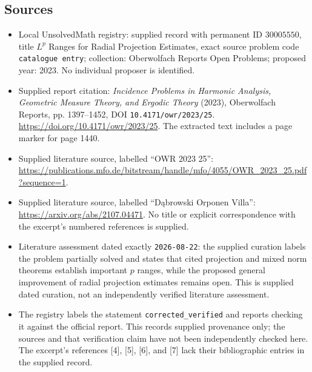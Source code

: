\documentclass[11pt]{article}
\begin{document}
\subsection{Sources}
\begin{itemize}
\item Local UnsolvedMath registry: supplied record with permanent ID \(30005550\), title \(L^p\) Ranges for Radial Projection Estimates, exact source problem code \texttt{catalogue entry}; collection: Oberwolfach Reports Open Problems; proposed year: 2023. No individual proposer is identified.
\item Supplied report citation: \emph{Incidence Problems in Harmonic Analysis, Geometric Measure Theory, and Ergodic Theory} (2023), Oberwolfach Reports, pp. 1397--1452, DOI \texttt{10.4171/owr/2023/25}. \url{https://doi.org/10.4171/owr/2023/25}. The extracted text includes a page marker for page 1440.
\item Supplied literature source, labelled ``OWR 2023 25'': \url{https://publications.mfo.de/bitstream/handle/mfo/4055/OWR_2023_25.pdf?sequence=1}.
\item Supplied literature source, labelled ``Dąbrowski Orponen Villa'': \url{https://arxiv.org/abs/2107.04471}. No title or explicit correspondence with the excerpt's numbered references is supplied.
\item Literature assessment dated exactly \texttt{2026-08-22}: the supplied curation labels the problem partially solved and states that cited projection and mixed norm theorems establish important \(p\) ranges, while the proposed general improvement of radial projection estimates remains open. This is supplied dated curation, not an independently verified literature assessment.
\item The registry labels the statement \texttt{corrected\_verified} and reports checking it against the official report. This records supplied provenance only; the sources and that verification claim have not been independently checked here. The excerpt's references [4], [5], [6], and [7] lack their bibliographic entries in the supplied record.
\end{itemize}
\end{document}
